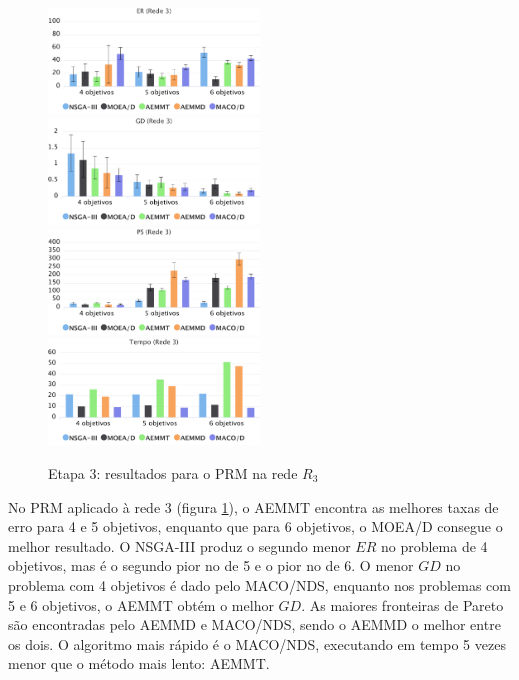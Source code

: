 \begin{figure}[!htbp]
	\caption{Etapa 3: resultados para o PRM na rede $R_3$}
	\label{fig_exp3_prm_r3}
	\includegraphics[width=0.5\textwidth]{cap_experimentos/figs/etapa3/er-mrp-r3}
	\includegraphics[width=0.5\textwidth]{cap_experimentos/figs/etapa3/gd-mrp-r3}
	\includegraphics[width=0.5\textwidth]{cap_experimentos/figs/etapa3/ps-mrp-r3}
	\includegraphics[width=0.5\textwidth]{cap_experimentos/figs/etapa3/time-mrp-r3}
\end{figure}

No PRM aplicado à rede 3 (figura \ref{fig_exp3_prm_r3}), o AEMMT encontra as melhores taxas de erro para 4 e 5 objetivos, enquanto que para 6 objetivos, o MOEA/D consegue o melhor resultado. O NSGA-III produz o segundo menor $ER$ no problema de 4 objetivos, mas é o segundo pior no de 5 e o pior no de 6. O menor $GD$ no problema com 4 objetivos é dado pelo MACO/NDS, enquanto nos problemas com 5 e 6 objetivos, o AEMMT obtém o melhor $GD$. As maiores fronteiras de Pareto são encontradas pelo AEMMD e MACO/NDS, sendo o AEMMD o melhor entre os dois. O algoritmo mais rápido é o MACO/NDS, executando em tempo 5 vezes menor que o método mais lento: AEMMT.

